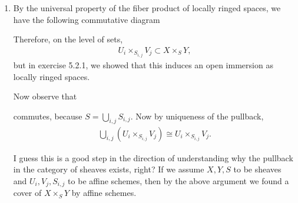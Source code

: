 \newcommand{\sheet}{6}




\maketitle{}

\begin{exercise}{1}
    \begin{enumerate}
        \item By the universal property of the fiber product of locally ringed spaces,
        we have the following commutative diagram
        \begin{center}
        \end{center}
        Therefore, on the level of sets,
        \begin{align*}
            U_i\times_{S_{i,j}}V_j \subset X \times_S Y,
        \end{align*}
        but in exercise 5.2.1, we showed that this induces 
        an open immersion as locally ringed spaces.

        Now observe that 
        \begin{center}
        \end{center}
        commutes, because $S=\bigcup_{i,j}S_{i,j}$.
        Now by uniqueness of the pullback, 
        \begin{align*}
           \bigcup_{i,j}\left(U_i\times_{S_{i,j}}V_j\right)\cong U_i\times_{S_{i,j}}V_j.
        \end{align*}

        I guess this is a good step in the direction of understanding
        why the pullback in the category of sheaves exists, right? If 
        we assume $X, Y, S$ to be sheaves and $U_i, V_j, S_{i,j}$ to be
        affine schemes, then by the above argument we found a cover
        of $X\times_S Y$ by affine schemes.


\end{enumerate}
\end{exercise}
